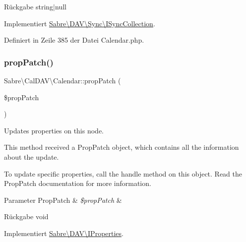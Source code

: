 \begin{DoxyReturn}{Rückgabe}
string$\vert$null 
\end{DoxyReturn}


Implementiert \mbox{\hyperlink{interface_sabre_1_1_d_a_v_1_1_sync_1_1_i_sync_collection_ae8b002d4a88dc34170f9468b5009e08f}{Sabre\textbackslash{}\+D\+A\+V\textbackslash{}\+Sync\textbackslash{}\+I\+Sync\+Collection}}.



Definiert in Zeile 385 der Datei Calendar.\+php.

\mbox{\label{class_sabre_1_1_cal_d_a_v_1_1_calendar_ac0dbb7fd0a45e725bfbe0cebdadf92e7}} 
\subsubsection{\texorpdfstring{prop\+Patch()}{propPatch()}}
{\footnotesize\ttfamily Sabre\textbackslash{}\+Cal\+D\+A\+V\textbackslash{}\+Calendar\+::prop\+Patch (\begin{DoxyParamCaption}\item[{\mbox{\hyperlink{class_sabre_1_1_d_a_v_1_1_prop_patch}{Prop\+Patch}}}]{\$prop\+Patch }\end{DoxyParamCaption})}

Updates properties on this node.

This method received a Prop\+Patch object, which contains all the information about the update.

To update specific properties, call the \textquotesingle{}handle\textquotesingle{} method on this object. Read the Prop\+Patch documentation for more information.


\begin{DoxyParams}[1]{Parameter}
Prop\+Patch & {\em \$prop\+Patch} & \\
\hline
\end{DoxyParams}
\begin{DoxyReturn}{Rückgabe}
void 
\end{DoxyReturn}


Implementiert \mbox{\hyperlink{interface_sabre_1_1_d_a_v_1_1_i_properties_a90973262bb85b17f98183ecd600acd84}{Sabre\textbackslash{}\+D\+A\+V\textbackslash{}\+I\+Properties}}.



